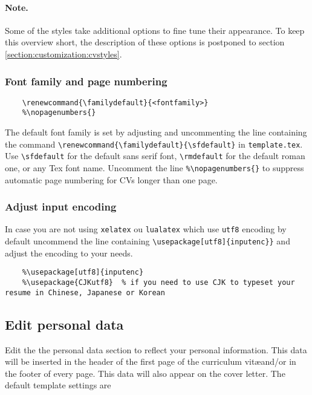 \documentclass[a4paper,11pt]{article}
\newcommand{\code}[1]{\lstinline!#1!}
\newcommand{\Code}[1]{\lstinline!#1! } %
\newcommand{\cvtemplate}{\code{template.tex}}
\begin{document}
\paragraph{Note.} Some of the styles take additional options to fine tune their appearance. To keep 
this overview short, the description of these options is postponed to section \ref{section:customization:cvstyles}.

\subsubsection*{Font family and page numbering}
\begin{lstlisting}
    \renewcommand{\familydefault}{<fontfamily>}
    %\nopagenumbers{}
\end{lstlisting}
The default font family is set by adjusting and uncommenting the line containing the command 
\lstinline!\renewcommand{\familydefault}{\sfdefault}! in \cvtemplate.
Use \lstinline!\sfdefault! for the default sans serif font, \lstinline!\rmdefault! for the default roman one, or any Tex font name.
 Uncomment the line \lstinline!%\nopagenumbers{}! to suppress automatic page numbering for CVs longer than one page.

\subsubsection*{Adjust input encoding}
In case you are not using \Code{xelatex} ou \Code{lualatex} which use \Code{utf8} encoding by default uncommend the line containing \lstinline!\usepackage[utf8]{inputenc}}! and adjust the encoding to your needs. 
\begin{lstlisting}
    %\usepackage[utf8]{inputenc}
    %\usepackage{CJKutf8}  % if you need to use CJK to typeset your resume in Chinese, Japanese or Korean
\end{lstlisting}

\subsection{Edit personal data}
Edit the the personal data section to reflect your personal information. This data will be inserted in the header of the first page of the curriculum vit\ae and/or in the footer of every page. 
This data will also appear on the cover letter. 
The default template settings are
\end{document}
